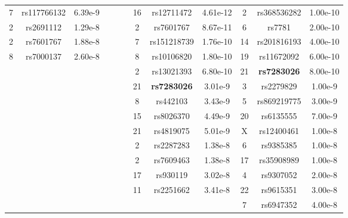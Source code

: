 \begin{adjustwidth}{-3 cm}{-2.5 cm}
\begin{threeparttable}[!htb]
\begin{tabular}{ccc||ccc||ccc||ccc}
			7 &rs117766132 &6.39e-9 & & & &16 &rs12711472 &4.61e-12 &2 &rs368536282 &1.00e-10 \\
			\cellcolor[HTML]{C8C8C8}2 &\cellcolor[HTML]{C8C8C8}rs2691112 &\cellcolor[HTML]{C8C8C8}1.29e-8 & & & &2 &rs7601767 &8.67e-11 &6 &rs7781 &2.00e-10 \\
			\cellcolor[HTML]{C8C8C8}2 &\cellcolor[HTML]{C8C8C8}rs7601767 &\cellcolor[HTML]{C8C8C8}1.88e-8 & & & &7 &rs151218739 &1.76e-10 &14 &rs201816193 &4.00e-10 \\
			\cellcolor[HTML]{C8C8C8}8 &\cellcolor[HTML]{C8C8C8}rs7000137 &\cellcolor[HTML]{C8C8C8}2.60e-8 & & & &8 &rs10106820 &1.80e-10 &19 &rs11672092 &6.00e-10 \\
			& & & & & &2 &rs13021393 &6.80e-10 &21 &\textbf{rs7283026} &8.00e-10 \\
			& & & & & &21 &\textbf{rs7283026} &3.01e-9 &3 &rs2279829 &1.00e-9 \\
			& & & & & &8 &rs442103 &3.43e-9 &5 &rs869219775 &3.00e-9 \\
			& & & & & &15 &rs8026370 &4.49e-9 &20 &rs6135555 &7.00e-9 \\
			& & & & & &21 &rs4819075 &5.01e-9 &\cellcolor[HTML]{C8C8C8}X &\cellcolor[HTML]{C8C8C8}rs12400461 &\cellcolor[HTML]{C8C8C8}1.00e-8 \\
			& & & & & &\cellcolor[HTML]{C8C8C8}2 &\cellcolor[HTML]{C8C8C8}rs2287283 &\cellcolor[HTML]{C8C8C8}1.38e-8 &\cellcolor[HTML]{C8C8C8}6 &\cellcolor[HTML]{C8C8C8}rs9385385 &\cellcolor[HTML]{C8C8C8}1.00e-8 \\
			& & & & & &\cellcolor[HTML]{C8C8C8}2 &\cellcolor[HTML]{C8C8C8}rs7609463 &\cellcolor[HTML]{C8C8C8}1.38e-8 &\cellcolor[HTML]{C8C8C8}17 &\cellcolor[HTML]{C8C8C8}rs35908989 &\cellcolor[HTML]{C8C8C8}1.00e-8 \\
			& & & & & &\cellcolor[HTML]{C8C8C8}17 &\cellcolor[HTML]{C8C8C8}rs930119 &\cellcolor[HTML]{C8C8C8}3.02e-8 &\cellcolor[HTML]{C8C8C8}4 &\cellcolor[HTML]{C8C8C8}rs9307052 &\cellcolor[HTML]{C8C8C8}2.00e-8 \\
			& & & & & &\cellcolor[HTML]{C8C8C8}11 &\cellcolor[HTML]{C8C8C8}rs2251662 &\cellcolor[HTML]{C8C8C8}3.41e-8 &\cellcolor[HTML]{C8C8C8}22 &\cellcolor[HTML]{C8C8C8}rs9615351 &\cellcolor[HTML]{C8C8C8}3.00e-8 \\
			& & & & & & & & &\cellcolor[HTML]{C8C8C8}7 &\cellcolor[HTML]{C8C8C8}rs6947352 &\cellcolor[HTML]{C8C8C8}4.00e-8 \\
			\bottomrule
		\end{tabular}
		\caption[Identified lead \acp{snp} for the entire hemisphere]{Identified lead \acp{snp} for the entire hemisphere across the different datasets, along with a comparison with \citet{Sha2021}. In gray, \acp{snp} with significance less than 1e-8 but greater than 5e-8 are reported. In bold are displayed the variants identified both in the present study and in the work of \citet{Sha2021}.}
		\label{tab:leadsnps}
\end{threeparttable}\end{adjustwidth}
